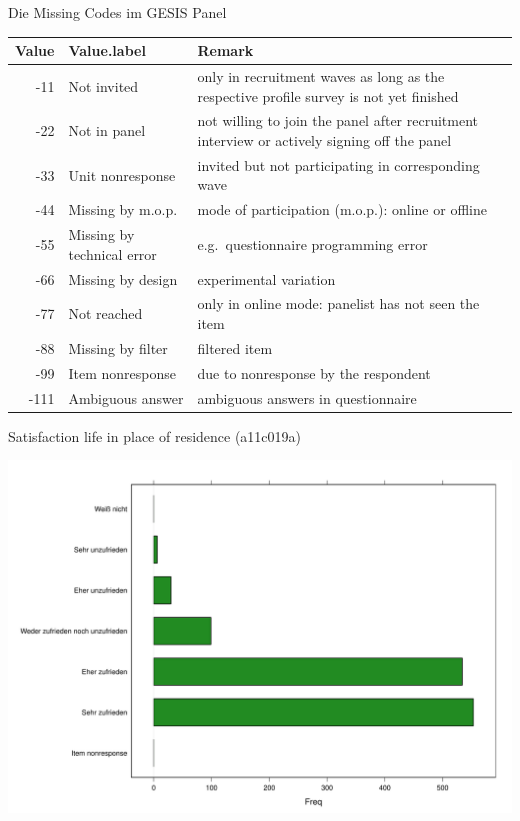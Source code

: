 \documentclass[ignorenonframetext,]{beamer}
\begin{document}
\begin{frame}{Die Missing Codes im GESIS Panel}

\begin{longtable}[]{@{}rll@{}}
\toprule
Value & Value.label & Remark\tabularnewline
\midrule
\endhead
-11 & Not invited & only in recruitment waves as long as the respective
profile survey is not yet finished\tabularnewline
-22 & Not in panel & not willing to join the panel after recruitment
interview or actively signing off the panel\tabularnewline
-33 & Unit nonresponse & invited but not participating in corresponding
wave\tabularnewline
-44 & Missing by m.o.p. & mode of participation (m.o.p.): online or
offline\tabularnewline
-55 & Missing by technical error & e.g.~questionnaire programming
error\tabularnewline
-66 & Missing by design & experimental variation\tabularnewline
-77 & Not reached & only in online mode: panelist has not seen the
item\tabularnewline
-88 & Missing by filter & filtered item\tabularnewline
-99 & Item nonresponse & due to nonresponse by the
respondent\tabularnewline
-111 & Ambiguous answer & ambiguous answers in
questionnaire\tabularnewline
\bottomrule
\end{longtable}

\end{frame}

\begin{frame}{Satisfaction life in place of residence (a11c019a)}

\includegraphics{A3_GESISPanel_files/figure-beamer/unnamed-chunk-17-1.pdf}

\end{frame}
\end{document}

